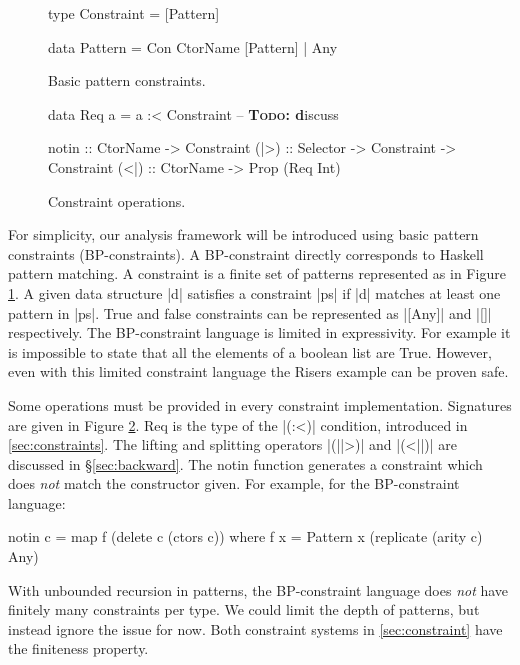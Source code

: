 \documentclass[preprint]{sigplanconf}
\newcommand{\C}[1]{\textsf{#1}}
\newcommand{\todo}[1]{\textbf{\textsc{Todo:} #1}}
\begin{document}
\begin{figure}
\begin{code}
type Constraint = [Pattern]

data Pattern  =  Con CtorName [Pattern]
              |  Any
\end{code}
\caption{Basic pattern constraints.}
\label{fig:basic}
\end{figure}

\begin{figure}
\begin{code}
data Req a = a :< Constraint -- \todo discuss

notin :: CtorName -> Constraint
(|>) :: Selector -> Constraint -> Constraint
(<|) :: CtorName -> Prop (Req Int)
\end{code}
\caption{Constraint operations.}
\label{fig:constraint}
\end{figure}

For simplicity, our analysis framework will be introduced using basic pattern constraints (BP-constraints). A BP-constraint directly corresponds to Haskell pattern matching. A constraint is a finite set of patterns represented as in Figure \ref{fig:basic}. A given data structure |d| satisfies a constraint |ps| if |d| matches at least one pattern in |ps|. True and false constraints can be represented as |[Any]| and |[]| respectively. The BP-constraint language is limited in expressivity. For example it is impossible to state that all the elements of a boolean list are True. However, even with this limited constraint language the Risers example can be proven safe.

Some operations must be provided in every constraint implementation. Signatures are given in Figure \ref{fig:constraint}. \C{Req} is the type of the |(:<)| condition, introduced in \ref{sec:constraints}. The lifting and splitting operators |(||>)| and |(<||)| are discussed in \S\ref{sec:backward}. The \C{notin} function generates a constraint which does \textit{not} match the constructor given. For example, for the BP-constraint language:

\begin{code}
notin c = map f (delete c (ctors c))
   where f x = Pattern x (replicate (arity c) Any)
\end{code}

With unbounded recursion in patterns, the BP-constraint language does \textit{not} have finitely many constraints per type. We could limit the depth of patterns, but instead ignore the issue for now. Both constraint systems in \ref{sec:constraint} have the finiteness property.
\end{document}
